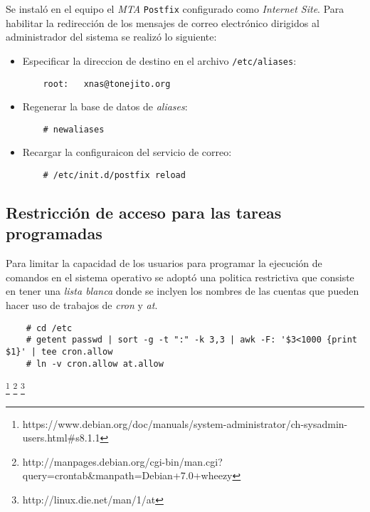 Se instal\'{o} en el equipo el \textsl{MTA} \texttt{Postfix} configurado como \textit{Internet Site}. Para habilitar la redirecci\'{o}n de los mensajes de correo electr\'{o}nico dirigidos al administrador del sistema se realiz\'{o} lo siguiente:

\begin{itemize}
  \item Especificar la direccion de destino en el archivo \texttt{/etc/aliases}:

{
\scriptsize
\linespread{1}
\begin{verbatim}
    root:	xnas@tonejito.org
\end{verbatim}
}

  \item Regenerar la base de datos de \textit{aliases}:

{
\scriptsize
\linespread{1}
\begin{verbatim}
    # newaliases
\end{verbatim}
}

  \item Recargar la configuraicon del servicio de correo:

{
\scriptsize
\linespread{1}
\begin{verbatim}
    # /etc/init.d/postfix reload
\end{verbatim}
}

\end{itemize}

      \subsection {Restricci\'{o}n de acceso para las tareas programadas}

Para limitar la capacidad de los usuarios para programar la ejecuci\'{o}n de comandos en el sistema operativo se adopt\'{o} una politica restrictiva que consiste en tener una \textit{lista blanca} donde se inclyen los nombres de las cuentas que pueden hacer uso de trabajos de \textsl{cron} y \textsl{at}.

{
\scriptsize
\linespread{1}
\begin{verbatim}
    # cd /etc
    # getent passwd | sort -g -t ":" -k 3,3 | awk -F: '$3<1000 {print $1}' | tee cron.allow
    # ln -v cron.allow at.allow
\end{verbatim}
}
\footnote{https://www.debian.org/doc/manuals/system-administrator/ch-sysadmin-users.html\#s8.1.1}
\footnote{http://manpages.debian.org/cgi-bin/man.cgi?query=crontab\&manpath=Debian+7.0+wheezy}
\footnote{http://linux.die.net/man/1/at}

